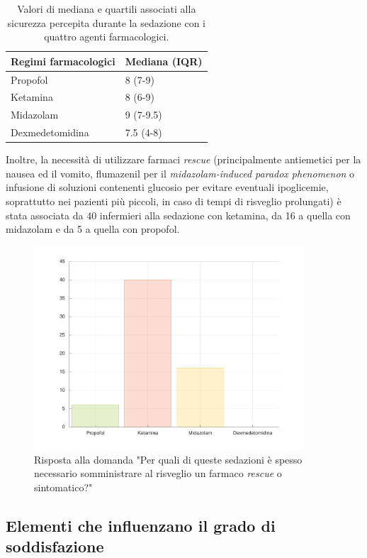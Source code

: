 \bgroup
\def\arraystretch{1.5}
\begin{table}[h]
    \centering
    \begin{tabular}{|l|l|}
         Regimi farmacologici & Mediana (IQR) \\ \hline
       Propofol & 8 (7-9)  \\
       Ketamina & 8 (6-9) \\
       Midazolam & 9 (7-9.5) \\
       Dexmedetomidina & 7.5 (4-8) 
    \end{tabular}
    \caption{Valori di mediana e quartili associati alla sicurezza percepita durante la sedazione con i quattro agenti farmacologici.}
    \label{tab:sicurezzased}
\end{table}
\egroup

Inoltre, la necessità di utilizzare farmaci \emph{rescue} (principalmente antiemetici per la nausea ed il vomito, flumazenil per il \emph{midazolam-induced paradox phenomenon} o infusione di soluzioni contenenti glucosio per evitare eventuali ipoglicemie, soprattutto nei pazienti più piccoli, in caso di tempi di risveglio prolungati) è stata associata da 40 infermieri alla sedazione con ketamina, da 16 a quella con midazolam e da 5 a quella con propofol.

\begin{figure}[!h]
    \centering
    \includegraphics[width=0.9\textwidth]{Figure/rescue.pdf}
    \caption{Risposta alla domanda "Per quali di queste sedazioni è spesso necessario somministrare al risveglio un farmaco \emph{rescue} o sintomatico?"}
    \label{fig:rescue}
\end{figure}

\subsection*{Elementi che influenzano il grado di soddisfazione}

